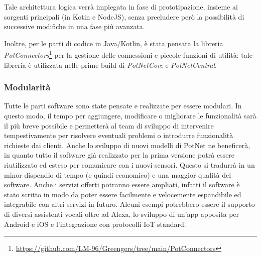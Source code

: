 Tale architettura logica verrà impiegata in fase di prototipazione, insieme ai sorgenti principali (in Kotin e NodeJS), senza precludere però la possibilità di successive modifiche in una fase più avanzata.

Inoltre, per le parti di codice in Java/Kotlin, è stata pensata la libreria \textit{PotConnectors}\footnote{\url{https://github.com/LM-96/Greengers/tree/main/PotConnectors}} per la gestione delle connessioni e piccole funzioni di utilità: tale libreria è utilizzata nelle prime build di \textit{PotNetCore} e \textit{PotNetCentral}.

\newpage
\subsubsection{Modularità}

Tutte le parti software sono state pensate e realizzate per essere modulari. In questo modo, il tempo per aggiungere, modificare o migliorare le funzionalità sarà il più breve possibile e permetterà al team di sviluppo di intervenire tempestivamente per risolvere eventuali problemi o introdurre funzionalità richieste dai clienti.
\newline Anche lo sviluppo di nuovi modelli di PotNet ne beneficerà, in quanto tutto il software già realizzato per la prima versione potrà essere riutilizzato ed esteso per comunicare con i nuovi sensori. Questo si tradurrà in un minor dispendio di tempo (e quindi economico) e una maggior qualità del software.
\newline\newline Anche i servizi offerti potranno essere ampliati, infatti il software è stato scritto in modo da poter essere facilmente e velocemente espandibile ed integrabile con altri servizi in futuro. Alcuni esempi potrebbero essere il supporto di diversi assistenti vocali oltre ad Alexa, lo sviluppo di un'app apposita per Android e iOS e l'integrazione con protocolli IoT standard.